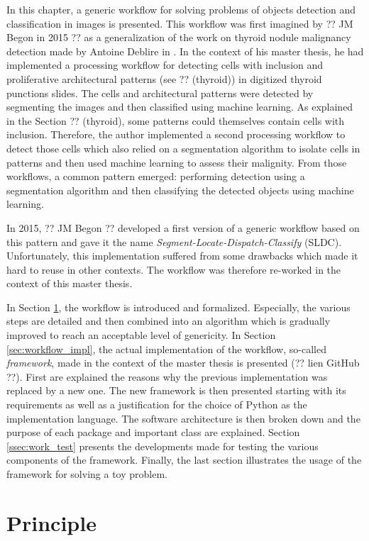 \label{chap:work_intro}
In this chapter, a generic workflow for solving problems of objects detection and classification in images is presented. This workflow was first imagined by ?? JM Begon in 2015 ?? as a generalization of the work on thyroid nodule malignancy detection made by Antoine Deblire in \cite{adeblire2013}. In the context of his master thesis, he had implemented a processing workflow for detecting cells with inclusion and proliferative architectural patterns (see ?? (thyroid)) in digitized thyroid punctions slides. The cells and architectural patterns were detected by segmenting the images and then classified using machine learning. As explained in the Section ?? (thyroid), some patterns could themselves contain cells with inclusion. Therefore, the author implemented a second processing workflow to detect those cells which also relied on a segmentation algorithm to isolate cells in patterns and then used machine learning to assess their malignity. From those workflows, a common pattern emerged: performing detection using a segmentation algorithm and then classifying the detected objects using machine learning. 

In 2015, ?? JM Begon ?? developed a first version of a generic workflow based on this pattern and gave it the name \textit{Segment-Locate-Dispatch-Classify} (SLDC). Unfortunately, this implementation suffered from some drawbacks which made it hard to reuse in other contexts. The workflow was therefore re-worked in the context of this master thesis. 
 
In Section \ref{sec:workflow_principle}, the workflow is introduced and formalized. Especially, the various steps are detailed and then combined into an algorithm which is gradually improved to reach an acceptable level of genericity. In Section  \ref{sec:workflow_impl}, the actual implementation of the workflow, so-called \textit{framework}, made in the context of the master thesis is presented (?? lien GitHub ??). First are explained the reasons why the previous implementation was replaced by a new one. The new framework is then presented starting with its requirements as well as a justification for the choice of Python as the implementation language. The software architecture is then broken down and the purpose of each package and important class are explained. Section \ref{ssec:work_test} presents the developments made for testing the various components of the framework. Finally, the last section illustrates the usage of the framework for solving a toy problem.

\section{Principle}
\label{sec:workflow_principle}

